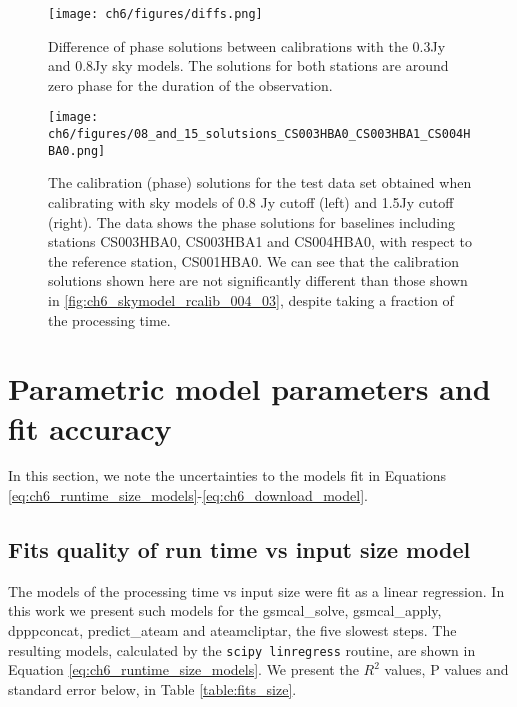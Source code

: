 \begin{subappendices}
\begin{figure}
    \texttt{[image: ch6/figures/diffs.png]}
      \caption{Difference of phase solutions between calibrations with the 0.3Jy and 0.8Jy sky models. The solutions for both stations are around zero phase for the duration of the observation.}
	\label{fig:ch6_diffs_solutions}
\end{figure}

\begin{figure}
    \texttt{[image: ch6/figures/08\_and\_15\_solutsions\_CS003HBA0\_CS003HBA1\_CS004HBA0.png]}
      \caption{The calibration (phase) solutions for the test data set obtained when calibrating with sky models of 0.8 Jy cutoff (left) and 1.5Jy cutoff (right). The data shows the phase solutions for baselines including stations CS003HBA0, CS003HBA1 and CS004HBA0, with respect to the reference station, CS001HBA0. We can see that the calibration solutions shown here are not significantly different than those shown in \ref{fig:ch6_skymodel_rcalib_004_03}, despite taking a fraction of the processing time.  }
	\label{fig:ch6_skymodel_rcalib_08_15}
\end{figure}

\section{Parametric model parameters and fit accuracy}\label{ap:ch6_model_params}

In this section, we note the uncertainties to the models fit in Equations \ref{eq:ch6_runtime_size_models}-\ref{eq:ch6_download_model}. 

\setcounter{equation}{6}
\renewcommand{\theequation}{\Alph{section}.\arabic{equation}}

\subsection{Fits quality of run time vs input size model}

The models of the processing time vs input size were fit as a linear regression. In this work we present such models for the {\selectfont  gsmcal\_solve}, {\selectfont gsmcal\_apply}, {\selectfont dpppconcat}, {\selectfont predict\_ateam} and {\selectfont ateamcliptar}, the five slowest steps. The resulting models, calculated by the \texttt{scipy linregress}\citep{scipy} routine, are shown in Equation \ref{eq:ch6_runtime_size_models}. We present the $R^2$ values, P values and standard error below, in Table \ref{table:fits_size}.




\end{subappendices}
